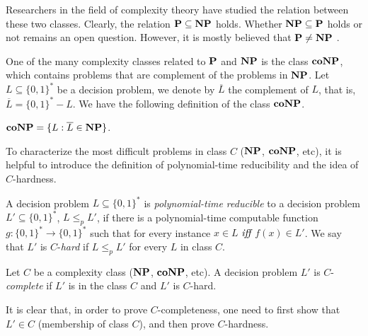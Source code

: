 Researchers in the field of complexity theory have studied
the relation between these two classes.
Clearly, the relation $\textbf{P} \subseteq \textbf{NP}$ holds. Whether
$\textbf{NP} \subseteq \textbf{P}$ holds or not remains an open question.
However, it is mostly believed that $\textbf{P} \not = \textbf{NP}$ \cite{gasarch2002p}. 


One of the many complexity classes related to $\textbf{P}$ and $\textbf{NP}$ \cite{gasarch2002p}
is the class $\textbf{coNP}$, which contains problems that are complement of 
the problems in $\textbf{NP}$.
Let $L \subseteq \{0,1\}^*$ be a decision problem, we denote by $\overline{L}$ the
complement of $L$, that is, $\overline{L} = \{0,1\}^*-L$.
We have the following definition of the class $\textbf{coNP}$.

\begin{definition}
	$\textbf{coNP} = \{L : \overline{L} \in \textbf{NP}\}$.
\end{definition}

To characterize the most difficult problems in class $C$ ($\textbf{NP}$, $\textbf{coNP}$, etc), 
it is helpful to introduce
the definition of polynomial-time reducibility \cite{gasarch2002p} and the 
idea of $C$-hardness.

\begin{definition}
	A decision problem $L \subseteq \{0,1\}^*$  is \textit{polynomial-time reducible} to
	a decision problem $L' \subseteq \{0,1\}^*$, $L \leq_p L'$, if there is a
	polynomial-time computable function $g : \{0,1\}^* \rightarrow \{0,1\}^*$
	such that for every instance $x \in L$ $\textit{iff}$ $f(x) \in L'$.
	We say that $L'$ is $C$-\textit{hard} if $L \leq_p L'$ for every $L$ in class $C$.
\end{definition}


\begin{definition}
	Let $C$ be a complexity class ($\textbf{NP}$, $\textbf{coNP}$, etc).
	A decision problem $L'$ is $C$-\textit{complete} if $L'$ is in the class 
	$C$ and $L'$ is $C$-hard.
\end{definition}
It is clear that, in order to prove $C$-completeness, one need to first show
that $L' \in C$ (membership of class $C$), and then prove $C$-hardness.



